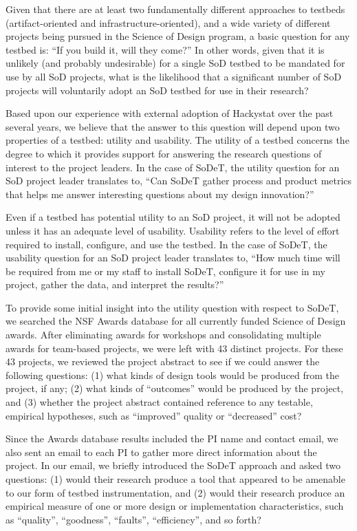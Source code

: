 Given that there are at least two fundamentally different approaches to
testbeds (artifact-oriented and infrastructure-oriented), and a wide variety of different
projects being pursued in the Science of Design program, a basic question
for any testbed is: ``If you build it, will they come?''  In other words,
given that it is unlikely (and probably undesirable) for a single SoD
testbed to be mandated for use by all SoD projects, what is the likelihood
that a significant number of SoD projects will voluntarily adopt an SoD
testbed for use in their research?

Based upon our experience with external adoption of Hackystat over the past
several years, we believe that the answer to this question will depend upon two
properties of a testbed: utility and usability.  The utility of a testbed
concerns the degree to which it provides support for answering the research
questions of interest to the project leaders.  In the case of SoDeT, the
utility question for an SoD project leader translates to, ``Can SoDeT
gather process and product metrics that helps me answer interesting
questions about my design innovation?''

Even if a testbed has potential utility to an SoD project, it will not be
adopted unless it has an adequate level of usability.  Usability refers to
the level of effort required to install, configure, and use the testbed.
In the case of SoDeT, the usability question for an SoD project leader
translates to, ``How much time will be required from me or my staff to
install SoDeT, configure it for use in my project, gather the data,
and interpret the results?''

To provide some initial insight into the utility question with respect to
SoDeT, we searched the NSF Awards database for all currently
funded Science of Design awards. After eliminating awards for workshops and
consolidating multiple awards for team-based projects, we were left with 43
distinct projects. For these 43 projects, we reviewed the project abstract
to see if we could answer the following questions: (1) 
what kinds of design tools would be produced from the project, if any; (2)
what kinds of ``outcomes'' would be produced by the project, and (3)
whether the project abstract contained reference to any testable, empirical
hypotheses, such as ``improved'' quality or ``decreased'' cost?

Since the Awards database results included the PI name and contact email,
we also sent an email to each PI to gather more direct information about
the project.  In our email, we briefly introduced the SoDeT
approach and asked two questions: (1) would their research produce a
tool that appeared to be amenable to our form of testbed instrumentation,
and (2) would their research produce an empirical measure of one or more
design or implementation characteristics, such as ``quality'',
``goodness'', ``faults'', ``efficiency'', and so forth?


